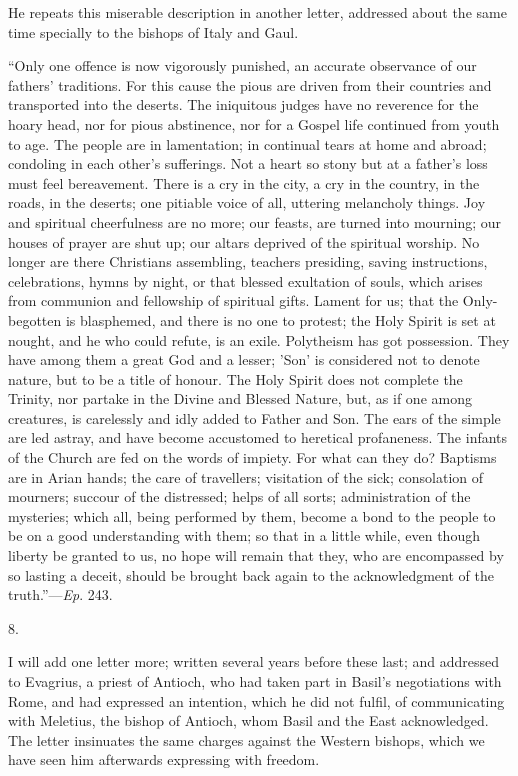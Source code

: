 He repeats this miserable description in another letter, addressed
about the same time specially to the bishops of Italy and Gaul.

``Only one offence is now vigorously punished, an accurate
observance of our fathers' traditions. For this cause the pious are
driven from their countries and transported into the deserts. The
iniquitous judges have no reverence for the hoary head, nor for pious
abstinence, nor for a Gospel life continued from youth to age. The
people are in lamentation; in continual tears at home and abroad;
condoling in each other's sufferings. Not a heart so stony but at a
father's loss must feel bereavement. There is a cry in the city, a cry
in the country, in the roads, in the deserts; one pitiable voice of
all, uttering melancholy things. Joy and spiritual cheerfulness are no
more; our feasts, are turned into mourning; our houses of prayer are
shut up; our altars deprived of the spiritual worship. No longer are
there Christians assembling, teachers presiding, saving instructions,
celebrations, hymns by night, or that blessed exultation of souls,
which arises from communion and fellowship of spiritual gifts. Lament
for us; that the Only-begotten is
blasphemed, and there is no one to protest; the Holy Spirit is set at
nought, and he who could refute, is an exile. Polytheism has got
possession. They have among them a great God and a lesser; 'Son' is
considered not to denote nature, but to be a title of honour. The Holy
Spirit does not complete the Trinity, nor partake in the Divine and
Blessed Nature, but, as if one among creatures, is carelessly and idly
added to Father and Son. The ears of the simple are led astray, and
have become accustomed to heretical profaneness. The infants of the
Church are fed on the words of impiety. For what can they do? Baptisms
are in Arian hands; the care of travellers; visitation of the sick;
consolation of mourners; succour of the distressed; helps of all
sorts; administration of the mysteries; which all, being performed by
them, become a bond to the people to be on a good understanding with
them; so that in a little while, even though liberty be granted to us,
no hope will remain that they, who are encompassed by so lasting a
deceit, should be brought back again to the acknowledgment of the
truth.''—\emph{Ep}. 243.

8.

I will add one letter more; written several years before these
last; and addressed to Evagrius, a priest of Antioch, who had taken
part in Basil's negotiations with Rome, and had expressed an
intention, which he did not fulfil, of communicating with Meletius,
the bishop of Antioch, whom Basil and the East acknowledged. The
letter insinuates the same charges against the Western bishops, which
we have seen him afterwards expressing with freedom.

